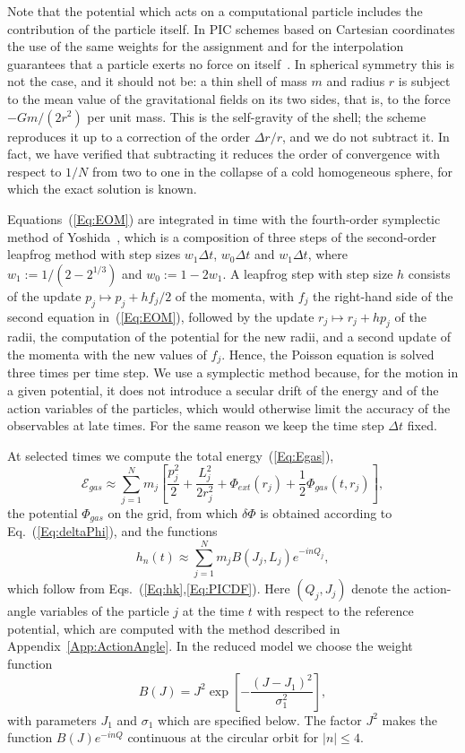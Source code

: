 Note that the potential which acts on a computational particle includes the contribution of the particle itself. In PIC schemes based on Cartesian coordinates the use of the same weights for the assignment and for the interpolation guarantees that a particle exerts no force on itself~\cite{BirdsallLangdon-Book,HockneyEastwood-Book}. In spherical symmetry this is not the case, and it should not be: a thin shell of mass $m$ and radius $r$ is subject to the mean value of the gravitational fields on its two sides, that is, to the force $-G m/(2r^2)$ per unit mass. This is the self-gravity of the shell; the scheme reproduces it up to a correction of the order $\Delta r/r$, and we do not subtract it. In fact, we have verified that subtracting it reduces the order of convergence with respect to $1/N$ from two to one in the collapse of a cold homogeneous sphere, for which the exact solution is known.

Equations~(\ref{Eq:EOM}) are integrated in time with the fourth-order symplectic method of Yoshida~\cite{hY90}, which is a composition of three steps of the second-order leapfrog method with step sizes $w_1\Delta t$, $w_0\Delta t$ and $w_1\Delta t$, where $w_1 := 1/(2 - 2^{1/3})$ and $w_0 := 1 - 2w_1$. A leapfrog step with step size $h$ consists of the update $p_j\mapsto p_j + h f_j/2$ of the momenta, with $f_j$ the right-hand side of the second equation in~(\ref{Eq:EOM}), followed by the update $r_j\mapsto r_j + h p_j$ of the radii, the computation of the potential for the new radii, and a second update of the momenta with the new values of $f_j$. Hence, the Poisson equation is solved three times per time step. We use a symplectic method because, for the motion in a given potential, it does not introduce a secular drift of the energy and of the action variables of the particles, which would otherwise limit the accuracy of the observables at late times. For the same reason we keep the time step $\Delta t$ fixed.

At selected times we compute the total energy~(\ref{Eq:Egas}),
\begin{equation}
\mathcal{E}_{gas}\approx \sum\limits_{j=1}^N m_j\left[ \frac{p_j^2}{2} + \frac{L_j^2}{2r_j^2} + \Phi_{ext}(r_j) + \frac{1}{2}\Phi_{gas}(t,r_j) \right],
\label{Eq:EgasPIC}
\end{equation}
the potential $\Phi_{gas}$ on the grid, from which $\delta\Phi$ is obtained according to Eq.~(\ref{Eq:deltaPhi}), and the functions
\begin{equation}
h_n(t)\approx \sum\limits_{j=1}^N m_j B(J_j,L_j) e^{-inQ_j},
\label{Eq:hnPIC}
\end{equation}
which follow from Eqs.~(\ref{Eq:hk},\ref{Eq:PICDF}). Here $(Q_j,J_j)$ denote the action-angle variables of the particle $j$ at the time $t$ with respect to the reference potential, which are computed with the method described in Appendix~\ref{App:ActionAngle}. In the reduced model we choose the weight function
\begin{equation}
B(J) = J^2\exp\left[ -\frac{(J - J_1)^2}{\sigma_1^2} \right],
\label{Eq:BDef}
\end{equation}
with parameters $J_1$ and $\sigma_1$ which are specified below. The factor $J^2$ makes the function $B(J)e^{-inQ}$ continuous at the circular orbit for $|n|\leq 4$.

